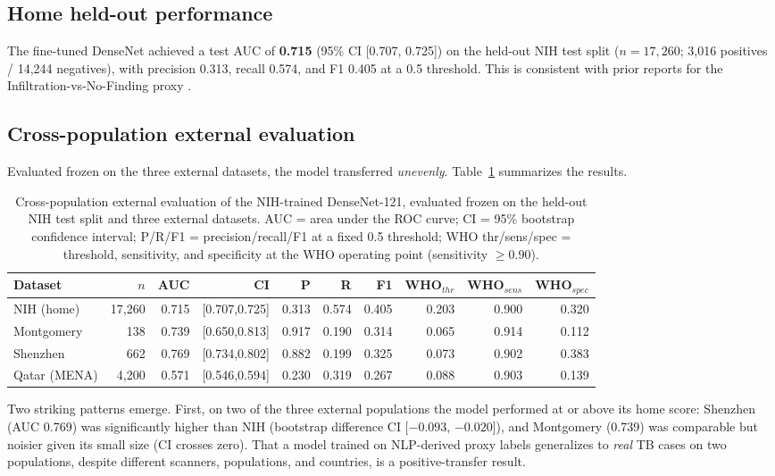 \documentclass[runningheads]{llncs}
\begin{document}
\subsection{Home held-out performance}
The fine-tuned DenseNet achieved a test AUC of \textbf{0.715} (95\% CI [0.707, 0.725]) on the held-out NIH test split ($n=17{,}260$; 3,016 positives / 14,244 negatives), with precision 0.313, recall 0.574, and F1 0.405 at a 0.5 threshold. This is consistent with prior reports for the Infiltration-vs-No-Finding proxy \cite{wang2017,rajpurkar2017}.

\subsection{Cross-population external evaluation}
Evaluated frozen on the three external datasets, the model transferred \emph{unevenly}. Table~\ref{tab:table1} summarizes the results.

\begin{table}[t]
\centering
\caption{Cross-population external evaluation of the NIH-trained DenseNet-121, evaluated frozen on the held-out NIH test split and three external datasets. AUC = area under the ROC curve; CI = 95\% bootstrap confidence interval; P/R/F1 = precision/recall/F1 at a fixed 0.5 threshold; WHO thr/sens/spec = threshold, sensitivity, and specificity at the WHO operating point (sensitivity $\geq 0.90$).}
\label{tab:table1}
\begin{tabular}{lrrrrrrrrr}
\toprule
Dataset & $n$ & AUC & CI & P & R & F1 & WHO$_{thr}$ & WHO$_{sens}$ & WHO$_{spec}$ \\
\midrule
NIH (home) & 17,260 & 0.715 & [0.707,0.725] & 0.313 & 0.574 & 0.405 & 0.203 & 0.900 & 0.320 \\
Montgomery & 138 & 0.739 & [0.650,0.813] & 0.917 & 0.190 & 0.314 & 0.065 & 0.914 & 0.112 \\
Shenzhen & 662 & 0.769 & [0.734,0.802] & 0.882 & 0.199 & 0.325 & 0.073 & 0.902 & 0.383 \\
Qatar (MENA) & 4,200 & 0.571 & [0.546,0.594] & 0.230 & 0.319 & 0.267 & 0.088 & 0.903 & 0.139 \\
\bottomrule
\end{tabular}
\end{table}

Two striking patterns emerge. First, on two of the three external populations the model performed at or above its home score: Shenzhen (AUC 0.769) was significantly higher than NIH (bootstrap difference CI [$-0.093$, $-0.020$]), and Montgomery (0.739) was comparable but noisier given its small size (CI crosses zero). That a model trained on NLP-derived proxy labels generalizes to \emph{real} TB cases on two populations, despite different scanners, populations, and countries, is a positive-transfer result.
\end{document}
